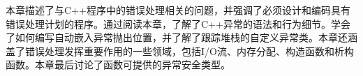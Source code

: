 本章描述了与C++程序中的错误处理相关的问题，并强调了必须设计和编码具有错误处理计划的程序。通过阅读本章，了解了C++异常的语法和行为细节。学会了如何编写自动嵌入异常抛出位置，并了解了跟踪堆栈的自定义异常类。本章还涵盖了错误处理发挥重要作用的一些领域，包括I/O流、内存分配、构造函数和析构函数。本章最后讨论了函数可提供的异常安全类型。
